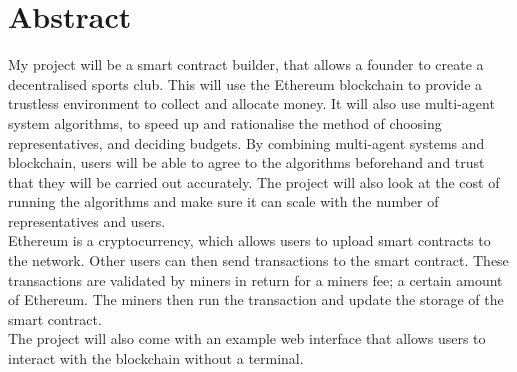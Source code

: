 \chapter{Abstract} \label{Chapter: Abstract}
My project will be a smart contract builder, that allows a founder to create a decentralised sports club. This will use the Ethereum blockchain to provide a trustless environment to collect and allocate money.  It will also use multi-agent system algorithms, to speed up and rationalise the method of choosing representatives, and deciding budgets. By combining multi-agent systems and blockchain, users will be able to agree to the algorithms beforehand and trust that they will be carried out accurately. The project will also look at the cost of running the algorithms and make sure it can scale with the number of representatives and users. \\
Ethereum is a cryptocurrency, which allows users to upload smart contracts to the network. Other users can then send transactions to the smart contract. These transactions are validated by miners in return for a miners fee; a certain amount of Ethereum. The miners then run the transaction and update the storage of the smart contract.\\
The project will also come with an example web interface that allows users to interact with the blockchain without a terminal.
